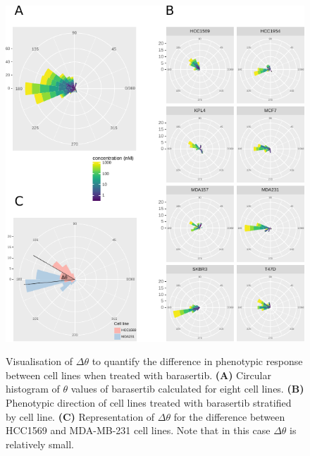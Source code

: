 \documentclass[a4paper,11pt,twoside,openright]{scrbook}
\begin{document}
\begin{figure}
    \captionsetup{width=0.8\textwidth}
    \caption[Visualisation of $\Delta\theta$ to quantify the difference in phenotypic direction between cell lines]{
Visualisation of $\Delta\theta$ to quantify the difference in phenotypic response between cell lines when treated with barasertib.
\textbf{(A)} Circular histogram of $\theta$ values of barasertib calculated for eight cell lines.
\textbf{(B)} Phenotypic direction of cell lines treated with barasertib stratified by cell line.
\textbf{(C)} Representation of $\Delta\theta$ for the difference between HCC1569 and MDA-MB-231 cell lines. Note that in this case $\Delta\theta$ is relatively small.
}
    \includegraphics[scale=1.15]{figs/ch3tccsCellLines}
    \label{figure:theta_cell_lines}
\end{figure}
\end{document}
